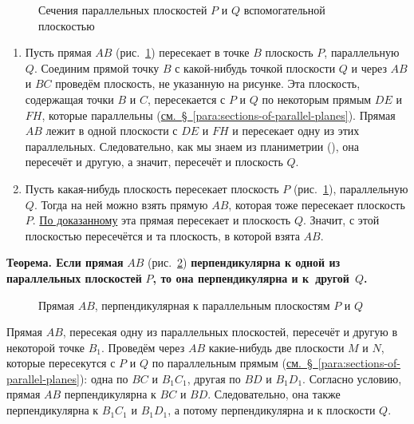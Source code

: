 \begin{figure}[htbp]
    \centering
    \renewcommand{\thefigure}{327}
    \captionsetup{name=Рис.,labelsep=period}
    
    \caption{Сечения параллельных плоскостей \(P\) и \(Q\) вспомогательной плоскостью}\label{fig:kiselev-stereo-327}
\end{figure}

\begin{enumerate}[label=\arabic*),ref=\arabic*]
    \item\label{item:line-intersects-both-parallel-planes} Пусть прямая \(AB\) (рис.~\ref{fig:kiselev-stereo-327}) пересекает в точке \(B\) плоскость \(P\), параллельную \(Q\). Соединим прямой точку \(B\) с какой-нибудь точкой плоскости \(Q\)
    и через \(AB\) и \(BC\) проведём плоскость, не указанную на рисунке. Эта плоскость, содержащая точки \(B\) и \(C\), пересекается с \(P\) и \(Q\) по некоторым прямым \(DE\) и \(FH\), которые параллельны (\hyperref[para:sections-of-parallel-planes]{см.~§~\ref*{para:sections-of-parallel-planes}}). Прямая \(AB\) лежит в одной плоскости с \(DE\) и \(FH\) и пересекает одну из этих параллельных. Следовательно, как мы знаем из планиметрии (), она пересечёт и другую, а значит, пересечёт и плоскость \(Q\).
    \item Пусть какая-нибудь плоскость пересекает плоскость \(P\) (рис.~\ref{fig:kiselev-stereo-327}), параллельную \(Q\). Тогда на ней можно взять прямую \(AB\), которая тоже пересекает плоскость \(P\). \hyperref[item:line-intersects-both-parallel-planes]{По доказанному} эта прямая пересекает и плоскость \(Q\). Значит, с этой плоскостью пересечётся и та плоскость, в которой взята \(AB\).
\end{enumerate}

 \textbf{Теорема. Если прямая} \(AB\) (рис.~\ref{fig:kiselev-stereo-328}) \textbf{перпендикулярна к одной из параллельных плоскостей} \(P\)\textbf{, то она перпендикулярна и к~другой}~\(Q\)\textbf{.}

\begin{figure}[htbp]
    \centering
    \renewcommand{\thefigure}{328}
    \captionsetup{name=Рис.,labelsep=period}
    
    \caption{Прямая \(AB\), перпендикулярная к параллельным плоскостям \(P\) и \(Q\)}\label{fig:kiselev-stereo-328}
\end{figure}

Прямая \(AB\), пересекая одну из параллельных плоскостей, пересечёт и другую в некоторой точке \(B_1\). Проведём через \(AB\) какие-нибудь две плоскости \(M\) и \(N\), которые пересекутся с \(P\) и \(Q\) по параллельным прямым (\hyperref[para:sections-of-parallel-planes]{см.~§~\ref*{para:sections-of-parallel-planes}}): одна по \(BC\) и \(B_1C_1\), другая по \(BD\) и \(B_1D_1\). Согласно условию, прямая \(AB\) перпендикулярна к \(BC\) и \(BD\). Следовательно, она также перпендикулярна к \(B_1C_1\) и \(B_1D_1\), а потому перпендикулярна и к плоскости \(Q\).

